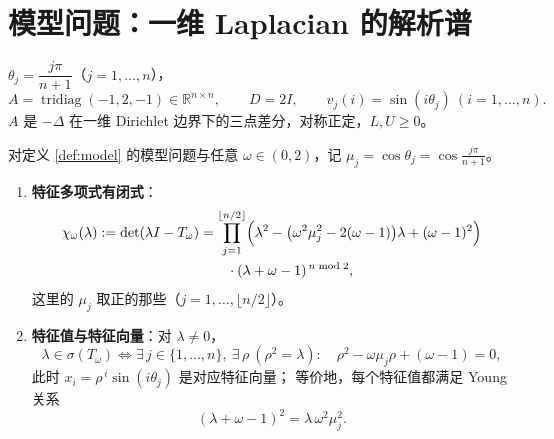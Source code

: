 \section{模型问题：一维 Laplacian 的解析谱}

\begin{definition}[模型问题]
\label{def:model}
$\theta_j=\dfrac{j\pi}{n+1}$（$j=1,\dots,n$），
\begin{equation}
  A=\operatorname{tridiag}(-1,2,-1)\in\mathbb R^{n\times n},\qquad
  D=2I,\qquad
  v_j(i)=\sin(i\theta_j)\ (i=1,\dots,n).
\end{equation}
$A$ 是 $-\Delta$ 在一维 Dirichlet 边界下的三点差分，对称正定，$L,U\ge0$。
\end{definition}

\begin{lemma}
\label{lem:transfer}
对定义 \ref{def:model} 的模型问题与任意 $\omega\in(0,2)$，记
$\mu_j=\cos\theta_j=\cos\frac{j\pi}{n+1}$。
\begin{enumerate}
  \item \textbf{特征多项式有闭式}：
  \begin{equation}
    \begin{split}
      \chi_\omega(\lambda):=\det(\lambda I-T_\omega)
      &=\prod_{j=1}^{\lfloor n/2\rfloor}
      \Bigl(\lambda^2-\bigl(\omega^2\mu_j^2-2(\omega-1)\bigr)\lambda+(\omega-1)^2\Bigr)\\
      &\qquad\cdot(\lambda+\omega-1)^{\,n\bmod 2},
    \end{split}
    \label{eq:sor-charpoly}
  \end{equation}
  这里的 $\mu_j$ 取正的那些（$j=1,\dots,\lfloor n/2\rfloor$）。
  \item \textbf{特征值与特征向量}：对 $\lambda\ne0$，
  \begin{equation}
    \lambda\in\sigma(T_\omega)
    \iff
    \exists\, j\in\{1,\dots,n\},\ \exists\,\rho\ (\rho^2=\lambda):
    \quad \rho^2-\omega\mu_j\rho+(\omega-1)=0,
    \label{eq:young-cond}
  \end{equation}
  此时 $x_i=\rho^{\,i}\sin(i\theta_j)$ 是对应特征向量；
  等价地，每个特征值都满足 Young 关系
  \begin{equation}
    (\lambda+\omega-1)^2=\lambda\,\omega^2\mu_j^2 .
    \label{eq:young}
  \end{equation}
\end{enumerate}
\end{lemma}

